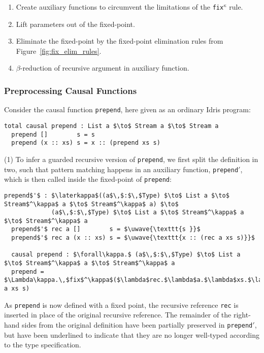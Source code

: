 \begin{enumerate}
\item Create auxiliary functions to circumvent the limitations of the
  \texttt{fix$^\kappa$} rule.
\item Lift parameters out of the fixed-point.
\item Eliminate the fixed-point by the fixed-point elimination rules from
  Figure~\ref{fig:fix_elim_rules}.
\item $\beta$-reduction of recursive argument in auxiliary function.
\end{enumerate}

\subsubsection{Preprocessing Causal Functions}
 Consider the causal function \texttt{prepend}, here
given as an ordinary Idris program:
\begin{lstlisting}[mathescape]
  total causal prepend : List a $\to$ Stream a $\to$ Stream a
  prepend []        s = s
  prepend (x :: xs) s = x :: (prepend xs s)
\end{lstlisting}
(1) To infer a guarded recursive version of \texttt{prepend}, we first split the
definition in two, such that pattern matching happens in an auxiliary function,
\texttt{prepend$'$}, which is then called inside the fixed-point of \texttt{prepend}:

\begin{lstlisting}[mathescape]
  prepend$'$ : $\laterkappa$((a$\,$:$\,$Type) $\to$ List a $\to$ Stream$^\kappa$ a $\to$ Stream$^\kappa$ a) $\to$ 
             (a$\,$:$\,$Type) $\to$ List a $\to$ Stream$^\kappa$ a $\to$ Stream$^\kappa$ a
  prepend$'$ rec a []        s = $\uwave{\texttt{s }}$
  prepend$'$ rec a (x :: xs) s = $\uwave{\texttt{x :: (rec a xs s)}}$

  causal prepend : $\forall\kappa.$ (a$\,$:$\,$Type) $\to$ List a $\to$ Stream$^\kappa$ a $\to$ Stream$^\kappa$ a
  prepend = $\Lambda\kappa.\,$fix$^\kappa$($\lambda$rec.$\lambda$a.$\lambda$xs.$\lambda$s.$\,$prepend$'\;$rec a xs s)
\end{lstlisting}
As \texttt{prepend} is now defined with a fixed point, the recursive reference
\texttt{rec} is inserted in place of the original recursive reference. The
remainder of the right-hand sides from the original definition have been partially preserved
in \texttt{prepend$'$}, but have been underlined to indicate that they are no
longer well-typed according to the type specification.

